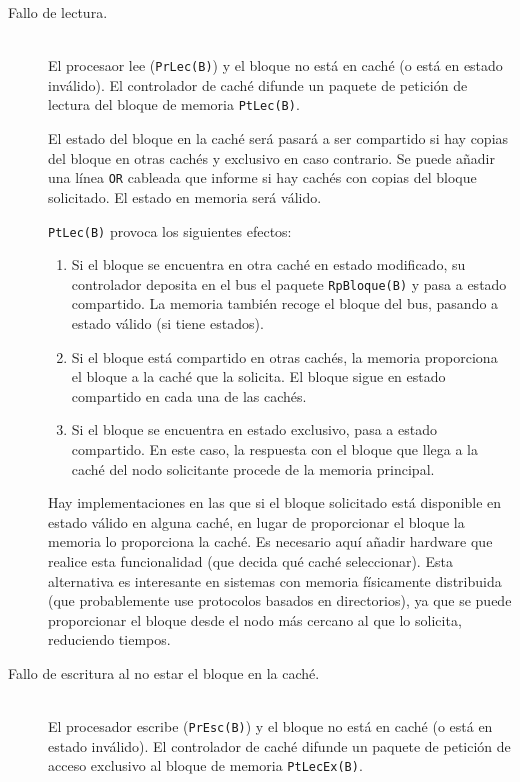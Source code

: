 \begin{description}
    \item [Fallo de lectura.]~\\
    El procesaor lee (\verb|PrLec(B)|) y el bloque no está en caché (o está en estado inválido). El controlador de caché difunde un paquete de petición de lectura del bloque de memoria \verb|PtLec(B)|.

    El estado del bloque en la caché será pasará a ser compartido si hay copias del bloque en otras cachés y exclusivo en caso contrario. Se puede añadir una línea \verb|OR| cableada que informe si hay cachés con copias del bloque solicitado. El estado en memoria será válido.

    \verb|PtLec(B)| provoca los siguientes efectos:
    \begin{enumerate}
        \item Si el bloque se encuentra en otra caché en estado modificado, su controlador deposita en el bus el paquete \verb|RpBloque(B)| y pasa a estado compartido. La memoria también recoge el bloque del bus, pasando a estado válido (si tiene estados).
        \item Si el bloque está compartido en otras cachés, la memoria proporciona el bloque a la caché que la solicita. El bloque sigue en estado compartido en cada una de las cachés.
        \item Si el bloque se encuentra en estado exclusivo, pasa a estado compartido. En este caso, la respuesta con el bloque que llega a la caché del nodo solicitante procede de la memoria principal.
    \end{enumerate}
    Hay implementaciones en las que si el bloque solicitado está disponible en estado válido en alguna caché, en lugar de proporcionar el bloque la memoria lo proporciona la caché. Es necesario aquí añadir hardware que realice esta funcionalidad (que decida qué caché seleccionar). Esta alternativa es interesante en sistemas con memoria físicamente distribuida (que probablemente use protocolos basados en directorios), ya que se puede proporcionar el bloque desde el nodo más cercano al que lo solicita, reduciendo tiempos.

    \item [Fallo de escritura al no estar el bloque en la caché.]~\\
        El procesador escribe (\verb|PrEsc(B)|) y el bloque no está en caché (o está en estado inválido). El controlador de caché difunde un paquete de petición de acceso exclusivo al bloque de memoria \verb|PtLecEx(B)|. 


\end{description}
